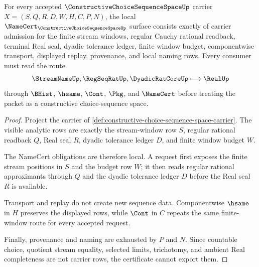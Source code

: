 \begin{theorem}
\label{thm:constructive-choice-sequence-space-namecert-obligations}
For every accepted $\ConstructiveChoiceSequenceSpaceUp$ carrier $X=(S,Q,R,D,W,H,C,P,N)$, the local $\NameCert_{\ConstructiveChoiceSequenceSpaceUp}$ surface consists exactly of carrier admission for the finite stream windows, regular Cauchy rational readback, terminal Real seal, dyadic tolerance ledger, finite window budget, componentwise transport, displayed replay, provenance, and local naming rows. Every consumer must read the route
$$
\StreamNameUp,\RegSeqRatUp,\DyadicRatCoreUp \longmapsto \RealUp
$$
through $\BHist$, $\hsame$, $\Cont$, $\Pkg$, and $\NameCert$ before treating the packet as a constructive choice-sequence space.
\end{theorem}
\begin{proof}
Project the carrier of \autoref{def:constructive-choice-sequence-space-carrier}. The visible analytic rows are exactly the stream-window row $S$, regular rational readback $Q$, Real seal $R$, dyadic tolerance ledger $D$, and finite window budget $W$.

The NameCert obligations are therefore local. A request first exposes the finite stream positions in $S$ and the budget row $W$; it then reads regular rational approximants through $Q$ and the dyadic tolerance ledger $D$ before the Real seal $R$ is available.

Transport and replay do not create new sequence data. Componentwise $\hsame$ in $H$ preserves the displayed rows, while $\Cont$ in $C$ repeats the same finite-window route for every accepted request.

Finally, provenance and naming are exhausted by $P$ and $N$. Since countable choice, quotient stream equality, selected limits, trichotomy, and ambient Real completeness are not carrier rows, the certificate cannot export them.
\end{proof}

